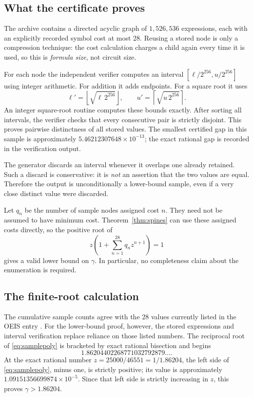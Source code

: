 \documentclass[11pt,letterpaper]{article}
\numberwithin{equation}{section}
\theoremstyle{definition}
\begin{document}
\subsection{What the certificate proves}

The archive contains a directed acyclic graph of $1{,}526{,}536$ expressions,
each with an explicitly recorded symbol cost at most 28. Reusing a stored
node is only a compression technique: the cost calculation charges a child
again every time it is used, so this is \emph{formula size}, not circuit size.

For each node the independent verifier computes an interval
$[\ell/2^{256},u/2^{256}]$ using integer arithmetic. For addition it adds
endpoints. For a square root it uses
\begin{equation}\label{eq:intervalsqrt}
 \ell'=\left\lfloor\sqrt{\ell\,2^{256}}\right\rfloor,
 \qquad
 u'=\left\lceil\sqrt{u\,2^{256}}\right\rceil.
\end{equation}
An integer square-root routine computes these bounds exactly.
After sorting all intervals, the verifier checks that every consecutive pair
is strictly disjoint. This proves pairwise distinctness of all stored values.
The smallest certified gap in this sample is approximately
$5.46212307648\times10^{-13}$; the exact rational gap is recorded in the
verification output.

The generator discards an interval whenever it overlaps one already retained.
Such a discard is conservative: it is \emph{not} an assertion that the two
values are equal. Therefore the output is unconditionally a lower-bound
sample, even if a very close distinct value were discarded.

Let $q_n$ be the number of sample nodes assigned cost $n$.
They need not be assumed to have minimum cost. Theorem~\ref{thm:spines}
can use these assigned costs directly, so the positive root of
\begin{equation}\label{eq:samplepoly}
 z\left(1+\sum_{n=1}^{28}q_nz^{n+1}\right)=1
\end{equation}
gives a valid lower bound on $\gamma$. In particular, no completeness claim
about the enumeration is required.

\subsection{The finite-root calculation}

The cumulative sample counts agree with the 28 values currently listed in
the OEIS entry \cite{oeis}. For the lower-bound proof, however, the stored
expressions and interval verification replace reliance on those listed
numbers.
The reciprocal root of \eqref{eq:samplepoly} is bracketed by exact rational
bisection and begins
\begin{equation}\label{eq:samplelambda}
 1.86204402268771032792879\ldots.
\end{equation}
At the exact rational number $z=25000/46551=1/1.86204$, the left side of
\eqref{eq:samplepoly}, minus one, is strictly positive; its value is
approximately $1.09151356699874\times10^{-5}$. Since that left side is
strictly increasing in $z$, this proves $\gamma>1.86204$.
\end{document}

